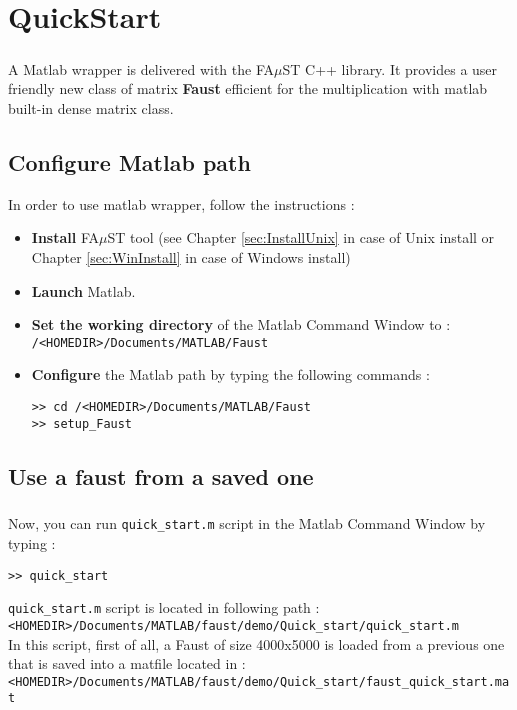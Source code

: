 \chapter{QuickStart}\label{sec:firstUse}


\paragraph{}A Matlab wrapper is delivered with the FA$\mu$ST C++ library.
It provides a user friendly new class of matrix \textbf{Faust} efficient for the multiplication with matlab built-in dense matrix class.\newline

\section{Configure Matlab path}\label{sec:firstUseMatlabPath}
In order to use matlab wrapper, follow the instructions :
\begin{itemize}
\item \textbf{Install} FA$\mu$ST tool (see Chapter \ref{sec:InstallUnix} in case of Unix install or Chapter \ref{sec:WinInstall} in case of Windows install)
\item \textbf{Launch} Matlab.
\item \textbf{Set the working directory} of the Matlab Command Window to :\\
\texttt{/<HOMEDIR>/Documents/MATLAB/Faust}
\item \textbf{Configure} the Matlab path by typing the following commands :
\begin{lstlisting}
>> cd /<HOMEDIR>/Documents/MATLAB/Faust
>> setup_Faust
\end{lstlisting}

\end{itemize}

\section{Use a faust from a saved one}\label{sec:firstUseBuildFromSave}
\paragraph{} Now, you can run \texttt{quick\_start.m} script in the Matlab Command Window by typing :
\begin{lstlisting}
>> quick_start
\end{lstlisting}
\texttt{quick\_start.m} script is located in following path :\\
\texttt{<HOMEDIR>/Documents/MATLAB/faust/demo/Quick\_start/quick\_start.m} \\
In this script, first of all, a Faust of size 4000x5000 is loaded from a previous one that is saved into a matfile located in :\\
\texttt{<HOMEDIR>/Documents/MATLAB/faust/demo/Quick\_start/faust\_quick\_start.mat}

\newpage
